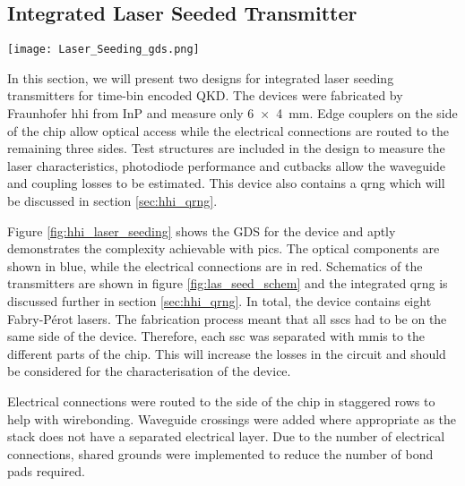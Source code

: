 \subsection{Integrated Laser Seeded Transmitter}

\begin{sidewaysfigure}
	\centering
	\texttt{[image: Laser\_Seeding\_gds.png]}
	\caption[InP laser seeding transmitter with \acs{qrng}]{This shows the layout of the laser seeded transmitter device fabricated by \acs{hhi}. The optical components are shown in blue while the electrical connections are in red. The chip measures \SI{6x4}{mm} and contains two laser seeding prototype circuits, a homodyne \acs{qrng} and test structure to measure laser and waveguide performances. Wires are routed to the side of the chip to allow wirebonding. Light is converted from the waveguide mode to a \SI{10}{\um} mode with \acsp{ssc} at the side of the chip.}
	\label{fig:hhi_laser_seeding}
\end{sidewaysfigure}

In this section, we will present two designs for integrated laser seeding transmitters for time-bin encoded \ac{QKD}. The devices were fabricated by Fraunhofer \ac{hhi} from \ac{InP} and measure only \SI{6x4}{mm}. Edge couplers on the side of the chip allow optical access while the electrical connections are routed to the remaining three sides. Test structures are included in the design to measure the laser characteristics, photodiode performance and cutbacks allow the waveguide and coupling losses to be estimated. This device also contains a \ac{qrng} which will be discussed in section \ref{sec:hhi_qrng}.

Figure \ref{fig:hhi_laser_seeding} shows the GDS for the device and aptly demonstrates the complexity achievable with \acp{pic}. The optical components are shown in blue, while the electrical connections are in red. Schematics of the transmitters are shown in figure \ref{fig:las_seed_schem} and the integrated \ac{qrng} is discussed further in section \ref{sec:hhi_qrng}. In total, the device contains eight Fabry-P\'{e}rot lasers. The fabrication process meant that all \acp{ssc} had to be on the same side of the device. Therefore, each \ac{ssc} was separated with \acp{mmi} to the different parts of the chip. This will increase the losses in the circuit and should be considered for the characterisation of the device. 

Electrical connections were routed to the side of the chip in staggered rows to help with wirebonding. Waveguide crossings were added where appropriate as the stack does not have a separated electrical layer. Due to the number of electrical connections, shared grounds were implemented to reduce the number of bond pads required.

